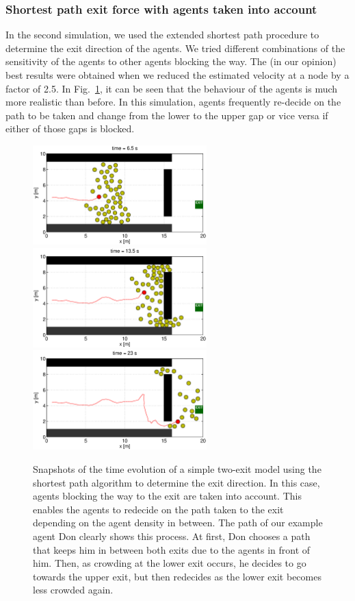 \documentclass[11pt]{article}
\begin{document}
\subsubsection{Shortest path exit force with agents taken into account}
In the second simulation, we used the extended shortest path procedure to determine the exit direction of the agents. We tried different combinations of the sensitivity of the agents to other agents blocking the way. The (in our opinion) best results were obtained when we reduced the estimated velocity at a node by a factor of 2.5. In Fig.~\ref{fig:two_exits2}, it can be seen that the behaviour of the agents is much more realistic than before. In this simulation, agents frequently re-decide on the path to be taken and change from the lower to the upper gap or vice versa if either of those gaps is blocked.

\begin{figure}
	\centering
	\includegraphics[width=0.6\textwidth]{figures/TwoExitsShortestPathWithAgents_000650.eps}
	\qquad
	\includegraphics[width=0.6\textwidth]{figures/TwoExitsShortestPathWithAgents_001350.eps}
	\qquad
	\includegraphics[width=0.6\textwidth]{figures/TwoExitsShortestPathWithAgents_002300.eps}
	\caption{Snapshots of the time evolution of a simple two-exit model using the shortest path algorithm to determine the exit direction. In this case, agents blocking the way to the exit are taken into account. This enables the agents to redecide on the path taken to the exit depending on the agent density in between. The path of our example agent Don clearly shows this process. At first, Don chooses a path that keeps him in between both exits due to the agents in front of him. Then, as crowding at the lower exit occurs, he decides to go towards the upper exit, but then redecides as the lower exit becomes less crowded again.}
	\label{fig:two_exits2}
\end{figure}
\end{document}
